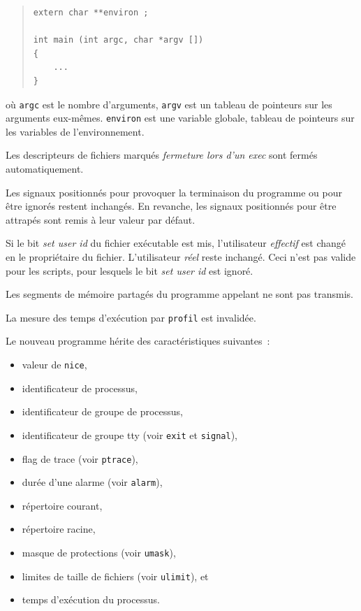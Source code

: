 \documentclass [twoside] {report}
\begin{document}
\begin {quote}
\begin {verbatim}
extern char **environ ;

int main (int argc, char *argv [])
{
    ...
}
\end{verbatim}
\end {quote}

où \texttt {argc} est le nombre d'arguments, \texttt {argv}
est un tableau de pointeurs sur les arguments
eux-mêmes. \texttt {environ} est une variable globale,
tableau de pointeurs sur les variables de l'environnement.

Les descripteurs de fichiers marqués \textit {fermeture
lors d'un exec} sont fermés automatiquement.

Les signaux positionnés pour provoquer la terminaison
du programme ou pour être ignorés restent
inchangés. En revanche, les signaux positionnés
pour être attrapés sont remis à leur valeur par
défaut.

Si le bit \textit {set user id} du fichier exécutable
est mis, l'utilisateur \textit {effectif} est changé en le
propriétaire du fichier. L'utilisateur \textit {réel}
reste inchangé. Ceci n'est pas valide pour les
scripts, pour lesquels le bit \textit {set user id} est
ignoré.

Les segments de mémoire partagés du programme
appelant ne sont pas transmis.

La mesure des temps d'exécution par \texttt {profil} est
invalidée.

Le nouveau programme hérite des caractéristiques
suivantes~:
\begin {itemize}
    \item valeur de \texttt {nice},
    \item identificateur de processus,
    \item identificateur de groupe de processus,
    \item identificateur de groupe tty (voir \texttt {exit} et \texttt {signal}),
    \item flag de trace (voir \texttt {ptrace}),
    \item durée d'une alarme (voir \texttt {alarm}),
    \item répertoire courant,
    \item répertoire racine,
    \item masque de protections (voir \texttt {umask}),
    \item limites de taille de fichiers (voir \texttt {ulimit}), et
    \item temps d'exécution du processus.
\end {itemize}
\end{document}
